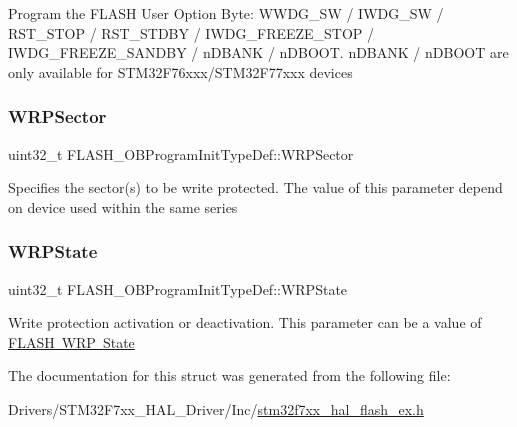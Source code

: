 Program the F\+L\+A\+SH User Option Byte\+: W\+W\+D\+G\+\_\+\+SW / I\+W\+D\+G\+\_\+\+SW / R\+S\+T\+\_\+\+S\+T\+OP / R\+S\+T\+\_\+\+S\+T\+D\+BY / I\+W\+D\+G\+\_\+\+F\+R\+E\+E\+Z\+E\+\_\+\+S\+T\+OP / I\+W\+D\+G\+\_\+\+F\+R\+E\+E\+Z\+E\+\_\+\+S\+A\+N\+D\+BY / n\+D\+B\+A\+NK / n\+D\+B\+O\+OT. n\+D\+B\+A\+NK / n\+D\+B\+O\+OT are only available for S\+T\+M32\+F76xxx/\+S\+T\+M32\+F77xxx devices \mbox{\label{struct_f_l_a_s_h___o_b_program_init_type_def_aa3db423f4b3038a56b67ca2d48af79ff}} 
\subsubsection{\texorpdfstring{WRPSector}{WRPSector}}
{\footnotesize\ttfamily uint32\+\_\+t F\+L\+A\+S\+H\+\_\+\+O\+B\+Program\+Init\+Type\+Def\+::\+W\+R\+P\+Sector}

Specifies the sector(s) to be write protected. The value of this parameter depend on device used within the same series \mbox{\label{struct_f_l_a_s_h___o_b_program_init_type_def_a2607ba046f7a3af46e7209b8f1e9e20d}} 
\subsubsection{\texorpdfstring{WRPState}{WRPState}}
{\footnotesize\ttfamily uint32\+\_\+t F\+L\+A\+S\+H\+\_\+\+O\+B\+Program\+Init\+Type\+Def\+::\+W\+R\+P\+State}

Write protection activation or deactivation. This parameter can be a value of \mbox{\hyperlink{group___f_l_a_s_h_ex___w_r_p___state}{F\+L\+A\+SH W\+RP State}} 

The documentation for this struct was generated from the following file\+:\begin{DoxyCompactItemize}
\item 
Drivers/\+S\+T\+M32\+F7xx\+\_\+\+H\+A\+L\+\_\+\+Driver/\+Inc/\mbox{\hyperlink{stm32f7xx__hal__flash__ex_8h}{stm32f7xx\+\_\+hal\+\_\+flash\+\_\+ex.\+h}}\end{DoxyCompactItemize}
